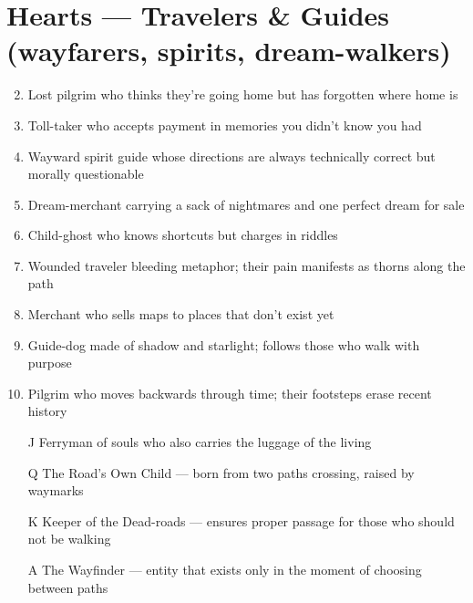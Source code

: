 \section*{Hearts --- Travelers \& Guides (wayfarers, spirits, dream-walkers)}
\begin{enumerate}
\setcounter{enumi}{1}
\item Lost pilgrim who thinks they're going home but has forgotten where home is
\item Toll-taker who accepts payment in memories you didn't know you had
\item Wayward spirit guide whose directions are always technically correct but morally questionable
\item Dream-merchant carrying a sack of nightmares and one perfect dream for sale
\item Child-ghost who knows shortcuts but charges in riddles
\item Wounded traveler bleeding metaphor; their pain manifests as thorns along the path
\item Merchant who sells maps to places that don't exist yet
\item Guide-dog made of shadow and starlight; follows those who walk with purpose
\item Pilgrim who moves backwards through time; their footsteps erase recent history
\item[J] Ferryman of souls who also carries the luggage of the living
\item[Q] The Road's Own Child --- born from two paths crossing, raised by waymarks
\item[K] Keeper of the Dead-roads --- ensures proper passage for those who should not be walking
\item[A] The Wayfinder --- entity that exists only in the moment of choosing between paths
\end{enumerate}

